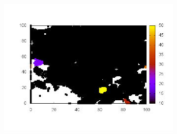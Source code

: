 \documentclass[10pt,a4paper]{article}
\begin{document}
\begin{figure}
\begin{subfigure}[b]{1\textwidth}
\includegraphics[scale=.3]{./img/SCC_Stable3/cut90p/14.png}
\end{subfigure}


\end{figure}
\end{document}
